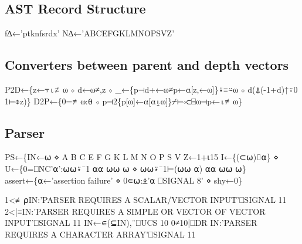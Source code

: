 \documentclass{article}%
\begin{document}
\subsection{AST Record Structure}

\nwenddocs{}\endmoddef\nwstartdeflinemarkup{}\nwenddeflinemarkup
f∆←'ptknfsrdx'
N∆←'ABCEFGKLMNOPSVZ'
\nwendcode{}\nwdocspar

\subsection{Converters between parent and depth vectors}

\nwenddocs{}\endmoddef\nwstartdeflinemarkup{}\nwenddeflinemarkup
P2D←\{z←⍪⍳≢⍵ ⋄ d←⍵≠,z ⋄ _←\{p⊣d+←⍵≠p←⍺[z,←⍵]\}⍣≡⍨⍵ ⋄ d(⍋(-1+d)↑⍤0 1⊢⌽z)\}
D2P←\{0=≢⍵:⍬ ⋄ p⊣2\{p[⍵]←⍺[⍺⍸⍵]\}⌿⊢∘⊂⌸⍵⊣p←⍳≢⍵\}
\nwendcode{}\nwdocspar

\subsection{Parser}

\nwenddocs{}\endmoddef\nwstartdeflinemarkup{}\nwenddeflinemarkup
 PS←\{IN←⍵ ⋄ A B C E F G K L M N O P S V Z←1+⍳15
   I←\{(⊂⍵)⌷⍺\} ⋄ U←\{0=⎕NC'⍺':⍵⍵⍣¯1 ⍺⍺ ⍵⍵ ⍵ ⋄ ⍵⍵⍣¯1⊢(⍵⍵ ⍺) ⍺⍺ ⍵⍵ ⍵\}
   assert←\{⍺←'assertion failure' ⋄ 0∊⍵:⍎'⍺ ⎕SIGNAL 8' ⋄ shy←0\}

   1<≢⍴IN:'PARSER REQUIRES A SCALAR/VECTOR INPUT'⎕SIGNAL 11
   2<|≡IN:'PARSER REQUIRES A SIMPLE OR VECTOR OF VECTOR INPUT'⎕SIGNAL 11
   IN←∊(⊆IN),¨⎕UCS 10
   0≠10|⎕DR IN:'PARSER REQUIRES A CHARACTER ARRAY'⎕SIGNAL 11
\end{document}
